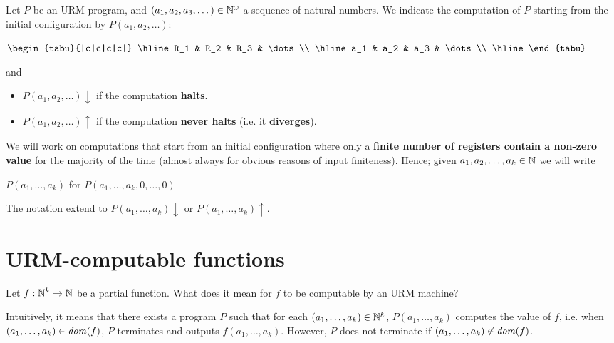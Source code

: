 \begin{notation}
  Let $P$ be an URM program, and $(a_1,a_2,a_3,\dots) \in \mathbb{N}^\omega$ a sequence
  of natural numbers. We indicate the computation of $P$ starting from the
  initial configuration by $P(a_1,a_2,\dots)$:

  \begin{center}
    $\begin{tabu}{|c|c|c|c|}
      \hline
      R_1 & R_2 & R_3 & \dots \\
      \hline
      a_1 & a_2 & a_3 & \dots \\
      \hline
    \end{tabu}$
  \end{center}

  and

  \begin{itemize}
  \item $P(a_1,a_2,\dots) \downarrow$ if the computation \textbf{halts}.
  \item $P(a_1,a_2,\dots) \uparrow$ if the computation \textbf{never
      halts} (i.e. it \textbf{diverges}).
  \end{itemize}


  We will work on computations that start from an initial configuration
  where only a \textbf{finite number of registers contain a non-zero value} for
  the majority of the time (almost always for obvious reasons of input
  finiteness). Hence; given $a_1,a_2,\dots,a_k \in \mathbb{N}$ we will write

  \begin{center}
    $P(a_1,\dots,a_k)$ for 
    $P(a_1,\dots,a_k,0,\dots,0)$
  \end{center}

  The notation extend to $P(a_1,\dots,a_k)\downarrow$ or
  $P(a_1,\dots,a_k)\uparrow$.
\end{notation}

\section{URM-computable functions}

Let $f : \mathbb{N}^k \rightarrow \mathbb{N}$ be a partial function. What does it mean for  $f$ to be computable by an URM machine?

Intuitively, it means that there exists a program $P$ such that for each $(a_1,\dots,a_k) \in \mathbb{N}^k$, 
$P(a_1,\dots,a_k)$ computes the value of $f$, i.e. when $(a_1,\dots,a_k) \in \mathit{dom}({f})$, 
$P$ terminates and outputs $f(a_1, \ldots, a_k)$. 
However, $P$ does not terminate if $(a_1,\dots,a_k) \not\in \mathit{dom}({f})$.

